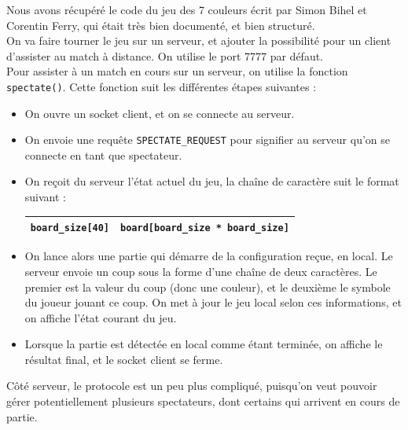 \documentclass[a4paper]{article}
\begin{document}
Nous avons récupéré le code du jeu des 7 couleurs écrit par Simon Bihel et Corentin Ferry, qui était très bien documenté, et bien structuré. \\

On va faire tourner le jeu sur un serveur, et ajouter la possibilité pour un client d'assister au match à distance.
On utilise le port 7777 par défaut. \\


Pour assister à un match en cours sur un serveur, on utilise la fonction \texttt{spectate()}. Cette fonction suit les différentes étapes suivantes :

%
\begin{itemize}
	\setlength\itemsep{0.5em}
	\item On ouvre un socket client, et on se connecte au serveur.
	\item On envoie une requête \texttt{SPECTATE\_REQUEST} pour signifier au serveur qu'on se connecte en tant que spectateur.
	\item On reçoit du serveur l'état actuel du jeu, la chaîne de caractère suit le format suivant :

		\bgroup
		\def\arraystretch{1.5}
		\begin{center}
		\begin{tabular}{|c|c|}
			\hline 
			\texttt{board\_size[40]} & \texttt{board[board\_size * board\_size]} \\ 
			\hline 
		\end{tabular} 	
		\end{center}
		\egroup
	
	\item On lance alors une partie qui démarre de la configuration reçue, en local. Le serveur envoie un coup sous la forme d'une chaîne de deux caractères. Le premier est la valeur du coup (donc une couleur), et le deuxième le symbole du joueur jouant ce coup. On met à jour le jeu local selon ces informations, et on affiche l'état courant du jeu. 
	\item Lorsque la partie est détectée en local comme étant terminée, on 
	affiche le résultat final, et le socket client se ferme. \\

\end{itemize}
%


\noindent Côté serveur, le protocole est un peu plus compliqué, puisqu'on veut pouvoir 
gérer potentiellement plusieurs spectateurs, dont certains qui arrivent en 
cours de partie. \\
\end{document}
